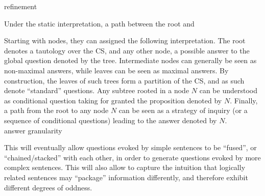\begin{exe}
	\label{ex2:recursive-interpretation}
 	\label{ex2:recursive-interpretation-cs}
\end{exe}



refinement


Under the static interpretation, a path between the root and 






Starting with nodes, they can assigned the following interpretation. The root denotes a tautology over the CS, and any other node, a possible answer to the global question denoted by the tree. Intermediate nodes can generally be seen as non-maximal answers, while leaves can be seen as maximal answers. By construction, the leaves of such trees form a partition of the CS, and as such denote ``standard'' questions. Any subtree rooted in a node $N$ can be understood as conditional question taking for granted the proposition denoted by $N$. Finally, a path from the root to any node $N$ can be seen as a strategy of inquiry (or a sequence of conditional questions) leading to the answer denoted by $N$.\\

answer granularity



This will eventually allow questions evoked by simple sentences to be ``fused'', or ``chained/stacked'' with each other, in order to generate questions evoked by more complex sentences. This will also allow to capture the intuition that logically related sentences may ``package'' information differently, and therefore exhibit different degrees of oddness.

